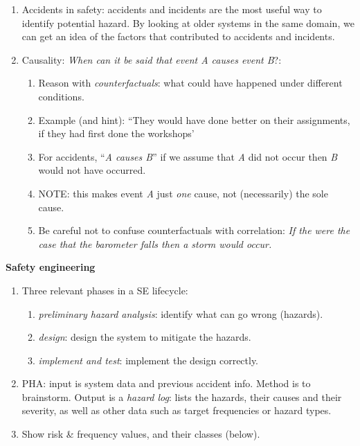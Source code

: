 \documentclass[11pt]{article}
\begin{document}
\begin{enumerate}
 \item Accidents in safety: accidents and incidents are the most useful way to identify potential hazard. By looking at older systems in the same domain, we can get an idea of the factors that contributed to accidents and incidents.

 \item Causality: \emph{When can it be said that event A causes event B}?:

 \begin{enumerate}

  \item Reason with \emph{counterfactuals}: what could have happened under different conditions.

  \item Example (and hint): ``They would have done better on their assignments, if they had first done the workshops'

  \item For accidents, ``{\em A causes B}'' if we assume that {\em A}
did not occur then {\em B} would not have occurred. 

  \item NOTE: this makes event \emph{A} just \emph{one} cause, not (necessarily) the sole cause.

  \item Be careful not to confuse counterfactuals with correlation: \emph{If the were the case that the barometer falls then a storm would occur.}

 \end{enumerate}

\end{enumerate}

\textbf{Safety engineering}

\begin{enumerate}

 \item Three relevant phases in a SE lifecycle:

  \begin{enumerate}

   \item \emph{preliminary hazard analysis}: identify what can go wrong (hazards).

   \item \emph{design}: design the system to mitigate the hazards.

   \item \emph{implement and test}: implement the design correctly.

  \end{enumerate}

  \item PHA: input is system data and previous accident info. Method is to brainstorm. Output is a \emph{hazard log}: lists the hazards, their causes and their  severity,  as well as other data such as target frequencies or hazard types.

  \item Show risk \& frequency values, and their classes (below).

\end{enumerate}
\end{document}
